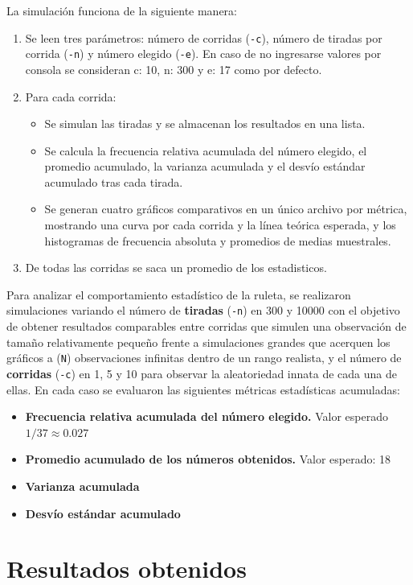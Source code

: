 \documentclass{article}
\begin{document}
\noindent La simulación funciona de la siguiente manera:
\begin{enumerate}
  \item Se leen tres parámetros: número de corridas (\texttt{-c}), número de tiradas por corrida (\texttt{-n}) y número elegido (\texttt{-e}). En caso de no ingresarse valores por consola se consideran c: 10, n: 300 y e: 17 como por defecto.
  \item Para cada corrida:
    \begin{itemize}
      \item Se simulan las tiradas y se almacenan los resultados en una lista.
      \item Se calcula la frecuencia relativa acumulada del número elegido, el promedio acumulado, la varianza acumulada y el desvío estándar acumulado tras cada tirada.
      \item Se generan cuatro gráficos comparativos en un único archivo por métrica, mostrando una curva por cada corrida y la línea teórica esperada, y  los histogramas de frecuencia absoluta y promedios de medias muestrales.
    \end{itemize}
    \item De todas las corridas se saca un promedio de los estadisticos.
\end{enumerate}

Para analizar el comportamiento estadístico de la ruleta, se realizaron simulaciones variando el número de \textbf{tiradas} (\texttt{-n}) en 300 y 10000 con el objetivo de obtener resultados comparables entre corridas que simulen una observación de tamaño relativamente pequeño frente a simulaciones grandes que acerquen los gráficos a (\texttt{N}) observaciones infinitas dentro de un rango realista, y el número de \textbf{corridas} (\texttt{-c}) en 1, 5 y 10 para observar la aleatoriedad innata de cada una de ellas. En cada caso se evaluaron las siguientes métricas estadísticas acumuladas:

\begin{itemize}
  \item \textbf{Frecuencia relativa acumulada del número elegido.} Valor esperado $1/37 \approx 0.027$
  \item \textbf{Promedio acumulado de los números obtenidos.} Valor esperado: 18
  \item \textbf{Varianza acumulada}
  \item \textbf{Desvío estándar acumulado}
\end{itemize}

\section{Resultados obtenidos}
\end{document}
